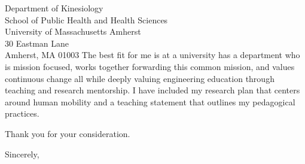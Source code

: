 \documentclass{letter}
\begin{document}
\begin{letter}{
  Department of Kinesiology \\
  School of Public Health and Health Sciences \\
  University of Massachusetts Amherst \\
  30 Eastman Lane \\
  Amherst, MA 01003
}
The best fit for me is at a university has a department who is mission focused,
works together forwarding this common mission, and values continuous change all
while deeply valuing engineering education through teaching and research
mentorship. I have included my research plan that centers around human mobility
and a teaching statement that outlines my pedagogical practices.

Thank you for your consideration.

\closing{Sincerely,}

\end{letter}
\end{document}
